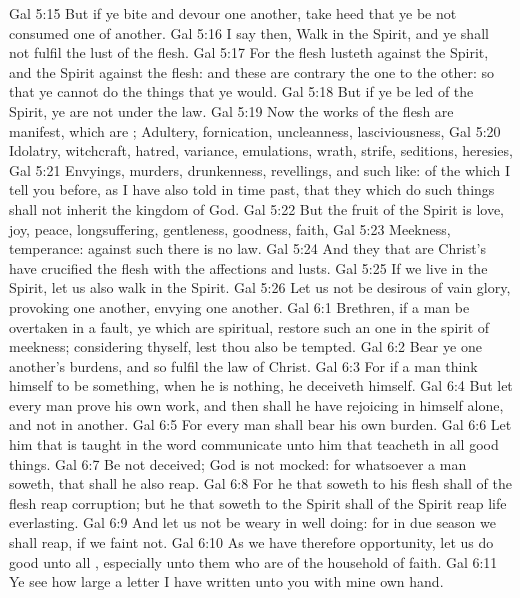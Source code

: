 \vs Gal 5:15 But if ye bite and devour one another, take heed that ye be not consumed one of another.
\vs Gal 5:16  I say then, Walk in the Spirit, and ye shall not fulfil the lust of the flesh.
\vs Gal 5:17 For the flesh lusteth against the Spirit, and the Spirit against the flesh: and these are contrary the one to the other: so that ye cannot do the things that ye would.
\vs Gal 5:18 But if ye be led of the Spirit, ye are not under the law.
\vs Gal 5:19 Now the works of the flesh are manifest, which are ; Adultery, fornication, uncleanness, lasciviousness,
\vs Gal 5:20 Idolatry, witchcraft, hatred, variance, emulations, wrath, strife, seditions, heresies,
\vs Gal 5:21 Envyings, murders, drunkenness, revellings, and such like: of the which I tell you before, as I have also told  in time past, that they which do such things shall not inherit the kingdom of God.
\vs Gal 5:22 But the fruit of the Spirit is love, joy, peace, longsuffering, gentleness, goodness, faith,
\vs Gal 5:23 Meekness, temperance: against such there is no law.
\vs Gal 5:24 And they that are Christ's have crucified the flesh with the affections and lusts.
\vs Gal 5:25 If we live in the Spirit, let us also walk in the Spirit.
\vs Gal 5:26 Let us not be desirous of vain glory, provoking one another, envying one another.
\vs Gal 6:1 Brethren, if a man be overtaken in a fault, ye which are spiritual, restore such an one in the spirit of meekness; considering thyself, lest thou also be tempted.
\vs Gal 6:2 Bear ye one another's burdens, and so fulfil the law of Christ.
\vs Gal 6:3 For if a man think himself to be something, when he is nothing, he deceiveth himself.
\vs Gal 6:4 But let every man prove his own work, and then shall he have rejoicing in himself alone, and not in another.
\vs Gal 6:5 For every man shall bear his own burden.
\vs Gal 6:6 Let him that is taught in the word communicate unto him that teacheth in all good things.
\vs Gal 6:7 Be not deceived; God is not mocked: for whatsoever a man soweth, that shall he also reap.
\vs Gal 6:8 For he that soweth to his flesh shall of the flesh reap corruption; but he that soweth to the Spirit shall of the Spirit reap life everlasting.
\vs Gal 6:9 And let us not be weary in well doing: for in due season we shall reap, if we faint not.
\vs Gal 6:10 As we have therefore opportunity, let us do good unto all , especially unto them who are of the household of faith.
\vs Gal 6:11 Ye see how large a letter I have written unto you with mine own hand.
